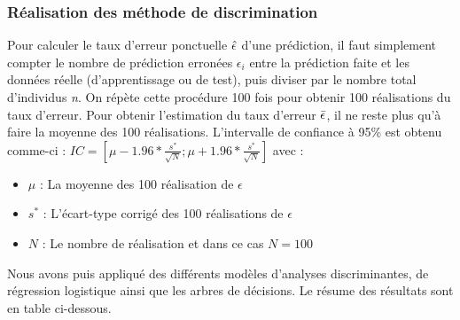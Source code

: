 \documentclass[a4paper,11pt,oneside,roman]{article}
\begin{document}
\subsubsection{Réalisation des méthode de discrimination}
Pour calculer le taux d'erreur ponctuelle $\Hat{\epsilon}$ d'une prédiction, il faut simplement compter le nombre de prédiction erronées $\epsilon_i$ entre la prédiction faite et les données réelle (d'apprentissage ou de test), puis diviser par le nombre total d'individus \textit{n}. \newline
On répète cette procédure 100 fois pour obtenir 100 réalisations du taux d'erreur. Pour obtenir l'estimation du taux d'erreur $\Bar{\epsilon}$, il ne reste plus qu'à faire la moyenne des 100 réalisations. \newline
L'intervalle de confiance à 95\% est obtenu comme-ci : $IC = \left[\mu - 1.96*\frac{s^{*}}{\sqrt{N}};\mu + 1.96*\frac{s^{*}}{\sqrt{N}} \right]$ avec : \newline
\begin{itemize}
    \item $\mu$ : La moyenne des 100 réalisation de $\epsilon$ \\
    \item $s^{*}$ : L'écart-type corrigé des 100 réalisations de $\epsilon$ \\
    \item $N$ : Le nombre de réalisation et dans ce cas $N=100$
\end{itemize}
Nous avons puis appliqué des différents modèles d'analyses discriminantes, de régression logistique ainsi que les arbres de décisions. Le résume des résultats sont en table ci-dessous.
\end{document}
